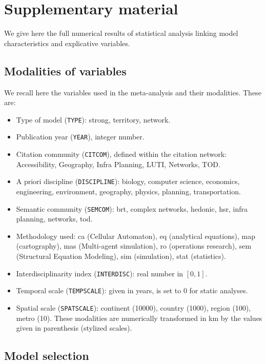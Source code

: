 \documentclass[10pt]{article}
\begin{document}
\section*{Supplementary material}


We give here the full numerical results of statistical analysis linking model characteristics and explicative variables.


\subsection*{Modalities of variables}

We recall here the variables used in the meta-analysis and their modalities. These are:

\begin{itemize}
	\item Type of model (\texttt{TYPE}): strong, territory, network.
	\item Publication year (\texttt{YEAR}), integer number.
	\item Citation community (\texttt{CITCOM}), defined within the citation network: Accessibility, Geography, Infra Planning, LUTI, Networks, TOD.
	\item A priori discipline (\texttt{DISCIPLINE}): biology, computer science, economics, engineering, environment, geography, physics, planning, transportation.
	\item Semantic community (\texttt{SEMCOM}): brt, complex networks, hedonic, hsr, infra planning, networks, tod.
	\item Methodology used: ca (Cellular Automaton), eq (analytical equations), map (cartography), mas (Multi-agent simulation), ro (operations research), sem (Structural Equation Modeling), sim (simulation), stat (statistics).
	\item Interdisciplinarity index (\texttt{INTERDISC}): real number in $[0,1]$.
	\item Temporal scale (\texttt{TEMPSCALE}): given in years, is set to 0 for static analyses.
	\item Spatial scale (\texttt{SPATSCALE}): continent (10000), country (1000), region (100), metro (10). These modalities are numerically transformed in km by the values given in parenthesis (stylized scales).
\end{itemize}

\subsection*{Model selection}
\end{document}
